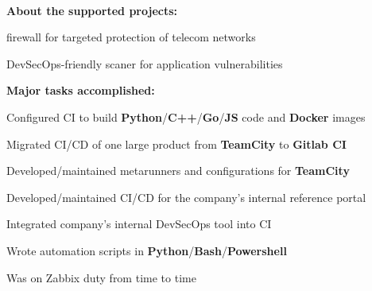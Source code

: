 \documentclass[a4paper]{MagicalCV}
\begin{document}
\begin{minipage}[t]{0.64\textwidth}
 \\
\vspace{\topsep} %
\textbf{About the supported projects:} 
\begin{tightemize}
  \item firewall for targeted protection of telecom networks
  \item DevSecOps-friendly scaner for application vulnerabilities
\end{tightemize}
\textbf{Major tasks accomplished:}
\begin{tightemize}
  \item Configured CI to build \textbf{Python}/\textbf{C++}/\textbf{Go}/\textbf{JS} code and \textbf{Docker} images
  \item Migrated CI/CD of one large product from \textbf{TeamCity} to \textbf{Gitlab CI}
  \item Developed/maintained metarunners and configurations for \textbf{TeamCity}
  \item Developed/maintained CI/CD for the company's internal reference portal
  \item Integrated company's internal DevSecOps tool into CI
  \item Wrote automation scripts in \textbf{Python}/\textbf{Bash}/\textbf{Powershell}
  \item Was on Zabbix duty from time to time
\end{tightemize}
\sectionsep

\end{minipage} 
\end{document}
